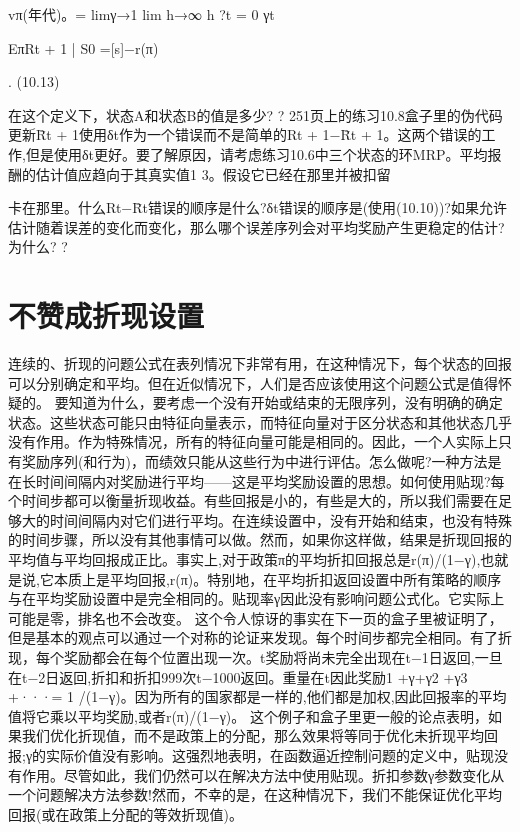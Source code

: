 vπ(年代)。= limγ→1 lim h→∞
h ?t = 0
γt

EπRt + 1 | S0 =[s]−r(π)

. 					(10.13)


在这个定义下，状态A和状态B的值是多少? 					?
251页上的练习10.8盒子里的伪代码更新R̄t + 1使用δt作为一个错误而不是简单的Rt + 1−R̄t + 1。这两个错误的工作,但是使用δt更好。要了解原因，请考虑练习10.6中三个状态的环MRP。平均报酬的估计值应趋向于其真实值1 3。假设它已经在那里并被扣留

卡在那里。什么Rt−R̄t错误的顺序是什么?δt错误的顺序是(使用(10.10))?如果允许估计随着误差的变化而变化，那么哪个误差序列会对平均奖励产生更稳定的估计?
为什么? 					?


\section{不赞成折现设置}

连续的、折现的问题公式在表列情况下非常有用，在这种情况下，每个状态的回报可以分别确定和平均。但在近似情况下，人们是否应该使用这个问题公式是值得怀疑的。
要知道为什么，要考虑一个没有开始或结束的无限序列，没有明确的确定状态。这些状态可能只由特征向量表示，而特征向量对于区分状态和其他状态几乎没有作用。作为特殊情况，所有的特征向量可能是相同的。因此，一个人实际上只有奖励序列(和行为)，而绩效只能从这些行为中进行评估。怎么做呢?一种方法是在长时间间隔内对奖励进行平均——这是平均奖励设置的思想。如何使用贴现?每个时间步都可以衡量折现收益。有些回报是小的，有些是大的，所以我们需要在足够大的时间间隔内对它们进行平均。在连续设置中，没有开始和结束，也没有特殊的时间步骤，所以没有其他事情可以做。然而，如果你这样做，结果是折现回报的平均值与平均回报成正比。事实上,对于政策π的平均折扣回报总是r(π)/(1−γ),也就是说,它本质上是平均回报,r(π)。特别地，在平均折扣返回设置中所有策略的顺序与在平均奖励设置中是完全相同的。贴现率γ因此没有影响问题公式化。它实际上可能是零，排名也不会改变。
这个令人惊讶的事实在下一页的盒子里被证明了，但是基本的观点可以通过一个对称的论证来发现。每个时间步都完全相同。有了折现，每个奖励都会在每个位置出现一次。t奖励将尚未完全出现在t−1日返回,一旦在t−2日返回,折扣和折扣999次t−1000返回。重量在t因此奖励1 +γ+γ2 +γ3 +···= 1 /(1−γ)。因为所有的国家都是一样的,他们都是加权,因此回报率的平均值将它乘以平均奖励,或者r(π)/(1−γ)。
这个例子和盒子里更一般的论点表明，如果我们优化折现值，而不是政策上的分配，那么效果将等同于优化未折现平均回报;γ的实际价值没有影响。这强烈地表明，在函数逼近控制问题的定义中，贴现没有作用。尽管如此，我们仍然可以在解决方法中使用贴现。折扣参数γ参数变化从一个问题解决方法参数!然而，不幸的是，在这种情况下，我们不能保证优化平均回报(或在政策上分配的等效折现值)。

